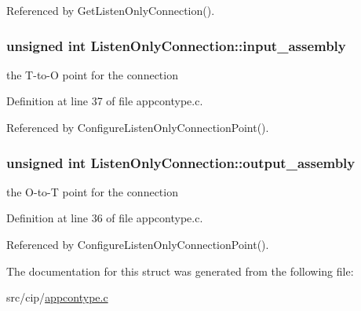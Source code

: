 \-Referenced by \-Get\-Listen\-Only\-Connection().

\hypertarget{structListenOnlyConnection_a0487168c1664b9849d15c00d5e730418}{
\subsubsection[{input\-\_\-assembly}]{\setlength{\rightskip}{0pt plus 5cm}unsigned int {\bf \-Listen\-Only\-Connection\-::input\-\_\-assembly}}}\label{d3/d01/structListenOnlyConnection_a0487168c1664b9849d15c00d5e730418}
the \-T-\/to-\/\-O point for the connection 

\-Definition at line 37 of file appcontype.\-c.



\-Referenced by \-Configure\-Listen\-Only\-Connection\-Point().

\hypertarget{structListenOnlyConnection_afedc3eb3f436950bb83b61078207909b}{
\subsubsection[{output\-\_\-assembly}]{\setlength{\rightskip}{0pt plus 5cm}unsigned int {\bf \-Listen\-Only\-Connection\-::output\-\_\-assembly}}}\label{d3/d01/structListenOnlyConnection_afedc3eb3f436950bb83b61078207909b}
the \-O-\/to-\/\-T point for the connection 

\-Definition at line 36 of file appcontype.\-c.



\-Referenced by \-Configure\-Listen\-Only\-Connection\-Point().



\-The documentation for this struct was generated from the following file\-:\begin{DoxyCompactItemize}
\item 
src/cip/\hyperlink{appcontype_8c}{appcontype.\-c}\end{DoxyCompactItemize}
